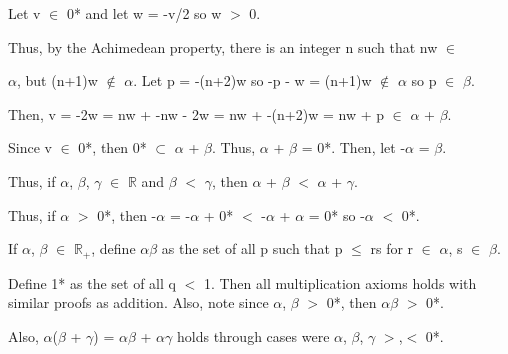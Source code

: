 \begin{adjustbox}{minipage=14cm, right, vspace=0.1cm 0cm}
			\qquad Let v $\in$ 0* and let w = -v/2 so w $>$ 0.

			\qquad Thus, by the Achimedean property, there is an integer n such that
			nw $\in$

			\qquad $\alpha$, but (n+1)w $\not \in$ $\alpha$.
			Let p = -(n+2)w so -p - w = (n+1)w $\not \in$ $\alpha$ so p $\in$ $\beta$.

			\qquad Then, v = -2w = nw + -nw - 2w = nw + -(n+2)w = nw + p $\in$ $\alpha$ + $\beta$.

			\qquad Since v $\in$ 0*, then 0* $\subset$ $\alpha$ + $\beta$.
			Thus, $\alpha$ + $\beta$ = 0*. Then, let -$\alpha$ = $\beta$.

		Thus, if $\alpha$, $\beta$, $\gamma$ $\in$ $\mathbb{R}$ and $\beta$ $<$ $\gamma$, then
		$\alpha$ + $\beta$ $<$ $\alpha$ + $\gamma$.

		Thus, if $\alpha$ $>$ 0*, then -$\alpha$ = -$\alpha$ + 0* $<$ -$\alpha$ + $\alpha$ = 0*
		so -$\alpha$ $<$ 0*.

		If $\alpha$, $\beta$ $\in$ $\mathbb{R}_+$, define $\alpha$$\beta$ as the set of all p
		such that p $\leq$ rs for r $\in$ $\alpha$, s $\in$ $\beta$.

		Define 1* as the set of all q $<$ 1.
		Then all multiplication axioms holds with similar proofs as addition.
		Also, note since $\alpha$, $\beta$ $>$ 0*, then $\alpha$$\beta$ $>$ 0*.

		Also, $\alpha$($\beta$ + $\gamma$) = $\alpha$$\beta$ + $\alpha$$\gamma$ holds
		through cases were $\alpha$, $\beta$, $\gamma$ $>$,$<$ 0*.
	\end{adjustbox}
































